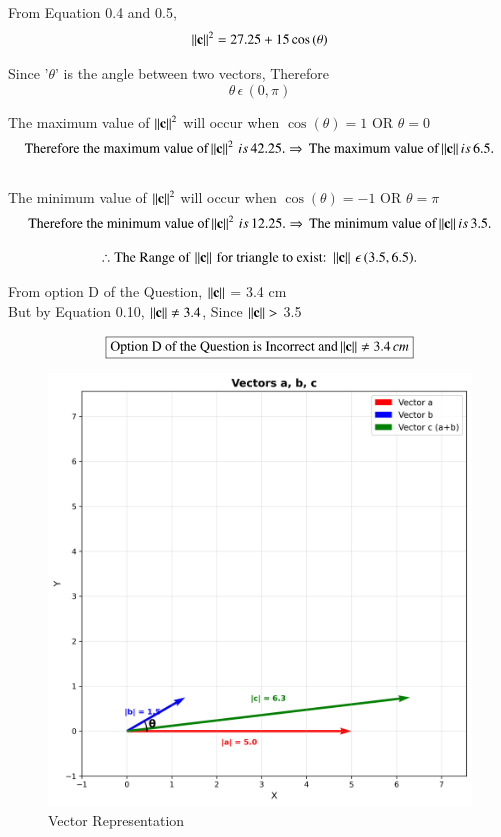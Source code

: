 \documentclass[journal]{IEEEtran}
\begin{document}
From Equation 0.4 and 0.5, 
\begin{equation}
    \left\lVert\mathbf{c}\right\rVert^2 = 27.25 + 15\cos{(\theta)}
\end{equation}

Since '$\theta$' is the angle between two vectors, Therefore 
\begin{equation}
\theta \, \epsilon \, (0,\pi)    
\end{equation}

\newpage

The maximum value of $\left\lVert\mathbf{c}\right\rVert^2$ will occur when $\cos{(\theta)}=1$ OR $\theta = 0$
\begin{equation}
    \text{Therefore the maximum value of} \left\lVert\mathbf{c}\right\rVert^2 \, is \, 42.25. \\
    \Rightarrow \, \text{The maximum value of} \left\lVert\mathbf{c}\right\rVert is \, 6.5.
\end{equation}\\

The minimum value of $\left\lVert\mathbf{c}\right\rVert^2$ will occur when $\cos{(\theta)}=-1$ OR $\theta = \pi$
\begin{equation}
    \text{Therefore the minimum value of} \left\lVert\mathbf{c}\right\rVert^2 \, is \, 12.25. \\
    \Rightarrow \, \text{The minimum value of} \left\lVert\mathbf{c}\right\rVert is \, 3.5.
\end{equation}

\begin{equation}
    \therefore \text{The Range of} \, \left\lVert\mathbf{c}\right\rVert \, \text{for triangle to exist: } \left\lVert\mathbf{c}\right\rVert \, \epsilon \, (3.5, 6.5).
\end{equation}

From option D of the Question, $\left\lVert\mathbf{c}\right\rVert$ = 3.4 cm\\
But by Equation 0.10, $\left\lVert\mathbf{c}\right\rVert \neq 3.4$, Since $\left\lVert\mathbf{c}\right\rVert > $  3.5

\begin{align}
    \boxed{\text{Option D of the Question is Incorrect and} \left\lVert\mathbf{c}\right\rVert \neq 3.4 \, cm}
\end{align}

\begin{figure}[htbp]
    \centering
    \includegraphics[width=\columnwidth]{figs/fig1.png}
    \caption{Vector Representation}
    \label{fig:fig/fig1.png}
\end{figure}
\end{document}
